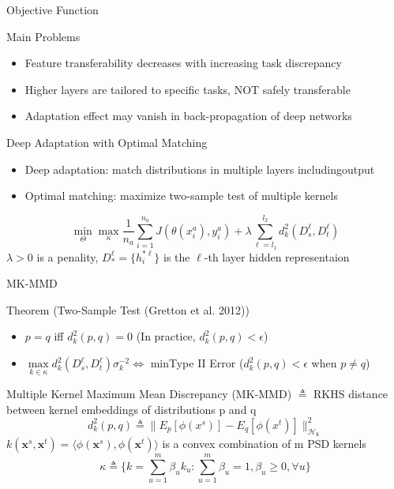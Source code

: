\documentclass{beamer}
\begin{document}
\begin{frame}[fragile]{Objective Function}

\begin{block}{Main Problems}
\begin{itemize}
\item{Feature transferability decreases with increasing task discrepancy}
\item{Higher layers are tailored to specific tasks, NOT safely transferable}
\item{Adaptation effect may vanish in back-propagation of deep networks}
\end{itemize}
\end{block}

\begin{block}{Deep Adaptation with Optimal Matching}
\begin{itemize}
\item{Deep adaptation: match distributions in multiple layers includingoutput}
\item{Optimal matching: maximize two-sample test of multiple kernels}
\end{itemize}
\begin{equation}
\min\limits_\Theta\max\limits_\kappa\frac{1}{n_a}\sum\limits_{i=1}^{n_a}J(\theta(x_i^a),y_i^a)+\lambda\sum\limits_{\ell=l_1}^{l_2}d_k^2(D_s^\ell,D_t^\ell)
\end{equation}
$\lambda > 0$ is a penality, $D_*^\ell=\{h_i^{*\ell}\}$ is the $\ell$-th layer hidden representaion
\end{block}

\end{frame}
\begin{frame}[fragile]{MK-MMD}
\begin{block}{Theorem (Two-Sample Test (Gretton et al. 2012))}
\begin{itemize}
\item{$p=q$ iff $d^2_k(p,q)=0$ (In practice,  $d^2_k(p,q)<\epsilon$})
\item{$\max\limits_{k \in \kappa}d_k^2(D_s^\ell,D_t^\ell)\sigma_k^{-2} \Leftrightarrow$ minType II Error ($d^2_k(p,q)<\epsilon$ when $p\neq q$)}
\end{itemize}
\end{block}
\begin{block}{Multiple Kernel Maximum Mean Discrepancy (MK-MMD)}
$\triangleq$ RKHS distance between kernel embeddings of distributions p and q
\begin{equation}
d_k^2(p,q)\triangleq \lVert E_p[\phi(x^s)]-E_q[\phi(x^t)] \rVert_\mathcal{H_\mathrm{k}}^2
\end{equation}
$k(\mathbf{x}^s,\mathbf{x}^t)=\langle\phi(\mathbf{x}^s), \phi(\mathbf{x}^t)\rangle$ is a convex combination of m PSD kernels
\begin{equation}
\kappa\triangleq\Bigg\{k=\sum\limits_{u=1}^m\beta_uk_u:\sum\limits_{u=1}^m\beta_u=1,\beta_u\geq0,\forall u\Bigg\}
\end{equation}
\end{block}

\end{frame}
\end{document}
